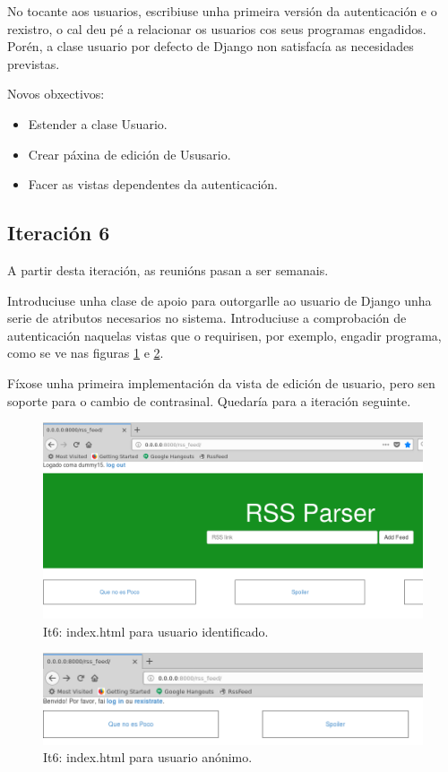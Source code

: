 No tocante aos usuarios, escribiuse unha primeira versión da autenticación e o rexistro, o cal deu pé a relacionar os usuarios cos seus programas engadidos. Porén, a clase usuario por defecto de Django non satisfacía as necesidades previstas.

Novos obxectivos:

\begin{itemize}
	\item Estender a clase Usuario.
	\item Crear páxina de edición de Ususario.
	\item Facer as vistas dependentes da autenticación.
\end{itemize}

\subsection{Iteración 6}

A partir desta iteración, as reunións pasan a ser semanais.

Introduciuse unha clase de apoio para outorgarlle ao usuario de Django unha serie de atributos necesarios no sistema. Introduciuse a comprobación de autenticación naquelas vistas que o requirisen, por exemplo, engadir programa, como se ve nas figuras \ref{fig:it6_log} e \ref{fig:it6_anon}.

Fíxose unha primeira implementación da vista de edición de usuario, pero sen soporte para o cambio de contrasinal. Quedaría para a iteración seguinte.

\begin{figure}[h]
	\centering
	\includegraphics[scale=0.4,keepaspectratio=true]{./images/it6_log.png}
	\caption{It6: index.html para usuario identificado.}
	\label{fig:it6_log}
\end{figure}

\begin{figure}[h]
	\centering
	\includegraphics[scale=0.5,keepaspectratio=true]{./images/it6_anon.png}
	\caption{It6: index.html para usuario anónimo.}
	\label{fig:it6_anon}
\end{figure}

